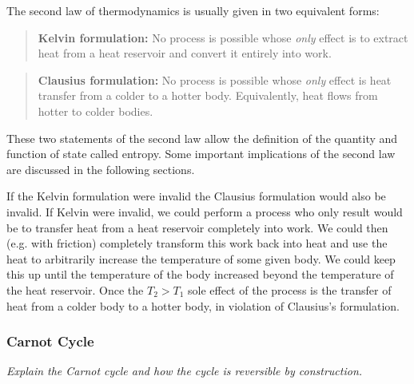 \documentclass[11pt, a4paper]{article}
\begin{document}
\smallskip
The second law of thermodynamics is usually given in two equivalent forms:
\begin{quote}
	\textbf{Kelvin formulation:} No process is possible whose \textit{only} effect is to extract heat from a heat reservoir and convert it entirely into work.
\end{quote}
\begin{quote}
	\textbf{Clausius formulation:} No process is possible whose \textit{only} effect is heat transfer from a colder to a hotter body. Equivalently, heat flows from hotter to colder bodies.
\end{quote}
These two statements of the second law allow the definition of the quantity and function of state called entropy. Some important implications of the second law are discussed in the following sections.

\smallskip 
If the Kelvin formulation were invalid the Clausius formulation would also be invalid. If Kelvin were invalid, we could perform a process who only result would be to transfer heat from a heat reservoir completely into work. We could then (e.g. with friction) completely transform this work back into heat and use the heat to arbitrarily increase the temperature of some given body. We could keep this up until the temperature of the body increased beyond the temperature of the heat reservoir. Once the $ T_{2} > T_{1} $ sole effect of the process is the transfer of heat from a colder body to a hotter body, in violation of Clausius's formulation. 

\subsubsection{Carnot Cycle}
\textit{Explain the Carnot cycle and how the cycle is reversible by construction.}
\end{document}
